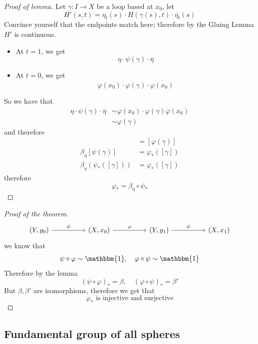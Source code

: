 \documentclass[11pt,a4paper]{article}
\theoremstyle{definition}
\theoremstyle{plain}
\theoremstyle{remark}
\newcommand{\1}{\mathbbm{1}}
\begin{document}
\begin{proof}[Proof of lemma]
    Let $\gamma \colon I \to X$ be a loop based at $x_0$, let 
    $$H'(s,t) = \eta_t (s) \cdot H(\gamma(s), t) \cdot \overline{\eta_t} (s)$$
    Convince yourself that the endpoints match here; therefore by the Gluing Lemma $H'$ is continuous. 
    \begin{itemize}
        \item At $t = 1$, we get 
        $$\eta \cdot \psi (\gamma) \cdot \overline{\eta}$$
        \item At $t = 0$, we get 
        $$\varphi(x_0) \cdot \varphi(\gamma) \cdot \overline{\varphi(x_0)}$$
    \end{itemize}
    So we have that 
    \begin{align*}
        \eta \cdot \psi (\gamma) \cdot \overline{\eta} &\sim \varphi(x_0) \cdot \varphi(\gamma) \overline{\varphi} (x_0) \\
        &\sim \varphi (\gamma)
    \end{align*} 
    and therefore
    \begin{align*}
        [\eta \cdot \psi (\gamma) \cdot \overline{\eta}] &= [\varphi (\gamma)]  \\
        \beta_\eta [\psi(\gamma)] &= \varphi_* ([\gamma]) \\
        \beta_\eta(\psi_*([\gamma])) &= \varphi_* ([\gamma])
    \end{align*}
    therefore 
    $$\varphi_* = \beta_\eta \circ \psi_*$$
\end{proof}

\begin{proof}[Proof of the theorem]
        \[
    \begin{tikzcd}[column sep=huge]
    (Y,y_0) \arrow[r,"\psi"] &
    (X,x_0) \arrow[r,"\varphi"] &
    (Y,y_1) \arrow[r,"\psi"] &
    (X,x_1)
    \end{tikzcd}
    \]
    we know that 
    $$\psi \circ \varphi \sim \1, \quad \varphi \circ \psi \sim \1$$
    Therefore by the lemma 
    $$(\psi \circ \varphi)_* = \beta, \quad (\varphi \circ \psi)_* = \beta'$$
    But $\beta, \beta'$ are isomorphisms, therefore we get that 
    $$\varphi_* \text{ is injective and surjective}$$
\end{proof}

\subsection{Fundamental group of all spheres} 
\end{document}
